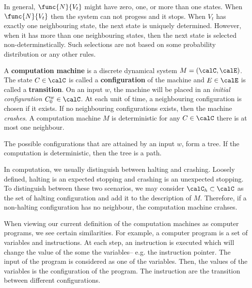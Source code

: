 \begin{remark}
    In general, \(\func{N}{V_t}\) might have zero, one, or more than one states. When \(\func{N}{V_t}\) then the system can not progess and it stops. When \(V_t\) has exactly one neighbouring state, the next state is uniquely determined. However, when it has more than one neighbouring states, then the next state is selected non-determinstically. Such selections are not based on some probability distribution or any other rules. 
\end{remark}

\begin{definition}
    A \textbf{computation machine} is a discrete dynamical system \(M = (\calC,\calE)\). The state \(C \in \calC\) is called a \textbf{configuration} of the machine and \(E \in \calE\) is called a \textbf{transition}. On an input \(w\), the machine will be placed in an \textit{initial configuration} \(C_0^w \in \calC\). At each unit of time, a neighbouring configuration is chosen if it exists. If no neighbouring configurations exists, then the machine \textit{crashes}. A computation machine \(M\) is deterministic for any \(C \in \calC\) there is at most one neighbour.
\end{definition}

The possible configurations that are attained by an input \(w\), form a tree. If the computation is deterministic, then the tree is a path. 

\begin{remark}
    In computation, we usually distinguish between halting and crashing. Loosely defined, halting is an expected stopping and crashing is an unexpected stopping. To distinguish between these two scenarios, we may consider \(\calC_h \subset \calC\) as the set of halting configuration and add it to the description of \(M\). Therefore, if a non-halting configuration has no neighbour, the computation machine crahses.
\end{remark}

When viewing our current definition of the computation machines as computer programs, we see certain similarities. For example, a computer program is a set of variables and instructions. At each step, an instruction is executed which will change the value of the some the variables-- e.g. the instruction pointer. The input of the program is considered as one of the variables. Then, the values of the variables is the configuration of the program. The instruction are the transition between different configurations.

